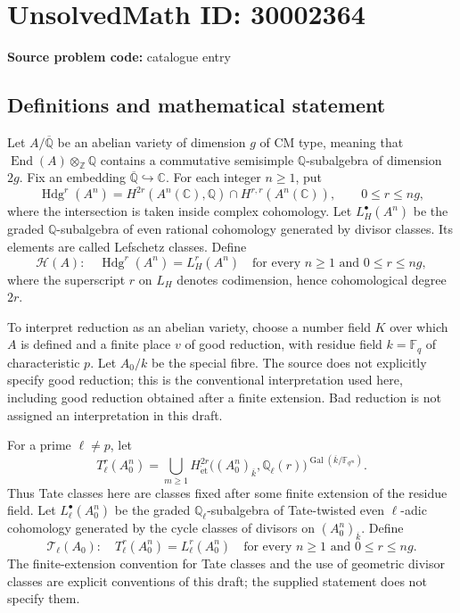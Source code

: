 \documentclass[11pt]{article}
\newcommand{\Z}{\mathbb{Z}}
\newcommand{\Q}{\mathbb{Q}}
\newcommand{\C}{\mathbb{C}}
\newcommand{\F}{\mathbb{F}}
\begin{document}
\section*{UnsolvedMath ID: 30002364}
\textbf{Source problem code:} catalogue entry
\subsection{Definitions and mathematical statement}
Let \(A/\overline{\Q}\) be an abelian variety of dimension \(g\) of CM type, meaning that \(\operatorname{End}(A)\otimes_{\Z}\Q\) contains a commutative semisimple \(\Q\)-subalgebra of dimension \(2g\). Fix an embedding \(\overline{\Q}\hookrightarrow\C\). For each integer \(n\geq 1\), put
\[
\operatorname{Hdg}^{r}(A^n)=H^{2r}(A^n(\C),\Q)\cap H^{r,r}(A^n(\C)),\qquad 0\leq r\leq ng,
\]
where the intersection is taken inside complex cohomology. Let \(L_H^\bullet(A^n)\) be the graded \(\Q\)-subalgebra of even rational cohomology generated by divisor classes. Its elements are called Lefschetz classes. Define
\[
\mathcal H(A):\quad \operatorname{Hdg}^{r}(A^n)=L_H^{r}(A^n)\quad\text{for every }n\geq1\text{ and }0\leq r\leq ng,
\]
where the superscript \(r\) on \(L_H\) denotes codimension, hence cohomological degree \(2r\).

To interpret reduction as an abelian variety, choose a number field \(K\) over which \(A\) is defined and a finite place \(v\) of good reduction, with residue field \(k=\F_q\) of characteristic \(p\). Let \(A_0/k\) be the special fibre. The source does not explicitly specify good reduction; this is the conventional interpretation used here, including good reduction obtained after a finite extension. Bad reduction is not assigned an interpretation in this draft.

For a prime \(\ell\ne p\), let
\[
T_\ell^{r}(A_0^n)=\bigcup_{m\geq1}H_{\mathrm{\acute et}}^{2r}\bigl((A_0^n)_{\overline{k}},\Q_\ell(r)\bigr)^{\operatorname{Gal}(\overline{k}/\F_{q^m})}.
\]
Thus Tate classes here are classes fixed after some finite extension of the residue field. Let \(L_\ell^\bullet(A_0^n)\) be the graded \(\Q_\ell\)-subalgebra of Tate-twisted even \(\ell\)-adic cohomology generated by the cycle classes of divisors on \((A_0^n)_{\overline{k}}\). Define
\[
\mathcal T_\ell(A_0):\quad T_\ell^{r}(A_0^n)=L_\ell^{r}(A_0^n)\quad\text{for every }n\geq1\text{ and }0\leq r\leq ng.
\]
The finite-extension convention for Tate classes and the use of geometric divisor classes are explicit conventions of this draft; the supplied statement does not specify them.
\end{document}
